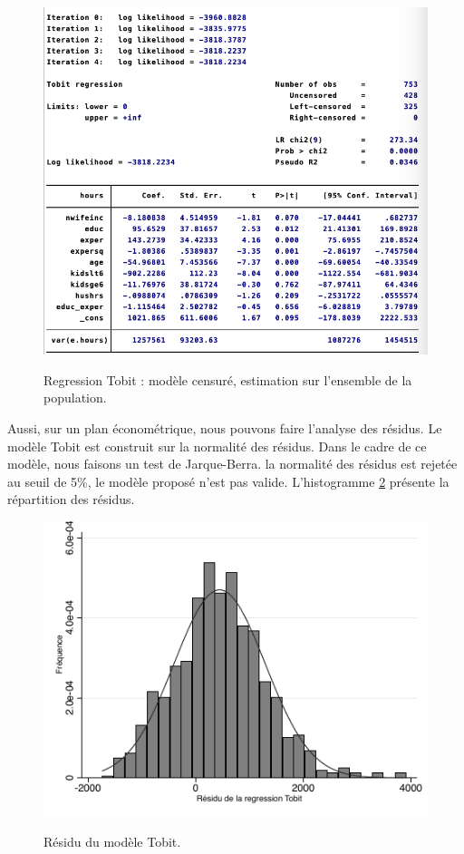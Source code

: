 \begin{figure}[h]
    \caption{Regression Tobit : modèle censuré, estimation sur l'ensemble de la population.}
    \includegraphics[scale = 0.8]{100_tab_results/tobit.png}
    \centering
    \label{fig:regTobit}
\end{figure}


Aussi, sur un plan économétrique, nous pouvons faire l’analyse des résidus. Le modèle Tobit est construit sur la normalité des résidus. Dans le cadre de ce modèle, nous faisons un test de Jarque-Berra. la normalité des résidus est rejetée au seuil de 5\%, le modèle proposé n’est pas valide. L'histogramme \ref{fig:residuTobit} présente la répartition des résidus.

\begin{figure}[h]
    \caption{Résidu du modèle Tobit.}
    \includegraphics{101_graphics/Tobitresidu.pdf}
    \centering
    \label{fig:residuTobit}
\end{figure}


